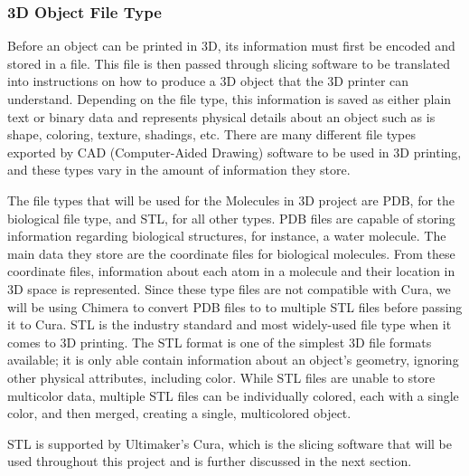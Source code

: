 \documentclass[letterpaper, onecolumn, draftclsnofoot, 10pt, compsoc]{IEEEtran}
\begin{document}
\begin{singlespace}
        \subsubsection{3D Object File Type}
	Before an object can be printed in 3D, its information must first be encoded and stored in a file. 
    This file is then passed through slicing software to be translated into instructions on how to produce a 3D object that the 3D printer can understand. 
	Depending on the file type, this information is saved as either plain text or binary data and represents physical details about an object such as is shape, coloring, texture, shadings, etc. \cite{all3dpweb}
	There are many different file types exported by CAD (Computer-Aided Drawing) software to be used in 3D printing, and these types vary in the amount of information they store. \par
	The file types that will be used for the Molecules in 3D project are PDB, for the biological file type, and STL, for all other types.
        PDB files are capable of storing information regarding biological structures, for instance, a water molecule.
        The main data they store are the coordinate files for biological molecules.
        From these coordinate files, information about each atom in a molecule and their location in 3D space is represented.\cite{pdbFile}
        Since these type files are not compatible with Cura, we will be using Chimera to convert PDB files to to multiple STL files before passing it to Cura.
        STL is the industry standard and most widely-used file type when it comes to 3D printing.
        The STL format is one of the simplest 3D file formats available; it is only able contain information about an object's geometry, ignoring other physical attributes, including color.\cite{3dbeginweb}
	While STL files are unable to store multicolor data, multiple STL files can be individually colored, each with a single color, and then merged, creating a single, multicolored object.\par
    STL is supported by Ultimaker's Cura, which is the slicing software that will be used throughout this project and is further discussed in the next section.
    

\end{singlespace}
\end{document}
